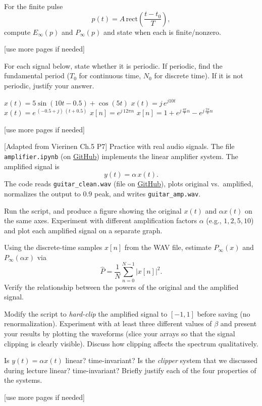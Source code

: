 \documentclass{ee102_pset}
\begin{document}
\problempart{[10 points]}  For the finite pulse
  \[
  p(t)=A\,\mathrm{rect}\!\left(\frac{t-t_0}{T}\right),
  \]
  compute $E_\infty(p)$ and $P_\infty(p)$ and state when each is finite/nonzero.

\vspace*{\fill}
\begin{center}
[use more pages if needed]
\end{center}

For each signal below, state whether it is periodic. If periodic, find the fundamental period ($T_0$ for continuous time, $N_0$ for discrete time). If it is not periodic, justify your answer.

\problempart{[5 points]} $x(t)=5\sin(10t-0.5)+\cos(5t)$
\problempart{[5 points]} $x(t)=j\,e^{j10t}$
\problempart{[5 points]} $x(t)=e^{\,(-0.5+j)\,(t+0.5)}$
\problempart{[5 points]} $x[n]=e^{j\,12\pi n}$
\problempart{[5 points]} $x[n]=1+e^{j\,\frac{4\pi}{7}n}-e^{j\,\frac{2\pi}{3}n}$

\vspace*{\fill}
\begin{center}
[use more pages if needed]
\end{center}

 [Adapted from Vierinen Ch.5 P7] Practice with real audio signals. The file \texttt{amplifier.ipynb} (on \href{https://github.com/ee-ucmerced/ee102-signals-systems/tree/main/homework/week2/amplifier.ipynb}{GitHub}) implements the linear amplifier system. The amplified signal is
\[
y(t)=\alpha\,x(t).
\]
The code reads \texttt{guitar\_clean.wav} (file on \href{https://github.com/ee-ucmerced/ee102-signals-systems/tree/main/homework/week2/guitar\_clean.wav}{GitHub}), plots original vs.\ amplified, normalizes the output to $0.9$ peak, and writes \texttt{guitar\_amp.wav}.

\problempart{[2.5 points]} Run the script, and produce a figure showing the original $x(t)$ and $\alpha x(t)$ on the same axes. Experiment with different amplification factors $\alpha$ (e.g., $1,2,5,10$) and plot each amplified signal on a separate graph.

\problempart{[10 points]} Using the discrete-time samples $x[n]$ from the WAV file, estimate $P_\infty(x)$ and $P_\infty(\alpha x)$ via
  \[
  \widehat{P}=\frac{1}{N}\sum_{n=0}^{N-1}|x[n]|^2.
  \]
  Verify the relationship between the powers of the original and the amplified signal.

\problempart{[5 points]} Modify the script to \emph{hard-clip} the amplified signal to $[-1,1]$ before saving (no renormalization). Experiment with at least three different values of $\beta$ and present your results by plotting the waveforms (slice your arrays so that the signal clipping is clearly visible). Discuss how clipping affects the spectrum qualitatively.

\problempart{[2.5 points]} Is $y(t)=\alpha x(t)$ linear? time-invariant? Is the \emph{clipper} system that we discussed during lecture linear? time-invariant? Briefly justify each of the four properties of the systems.
\vspace*{\fill}
\begin{center}
[use more pages if needed]
\end{center}
\end{document}
